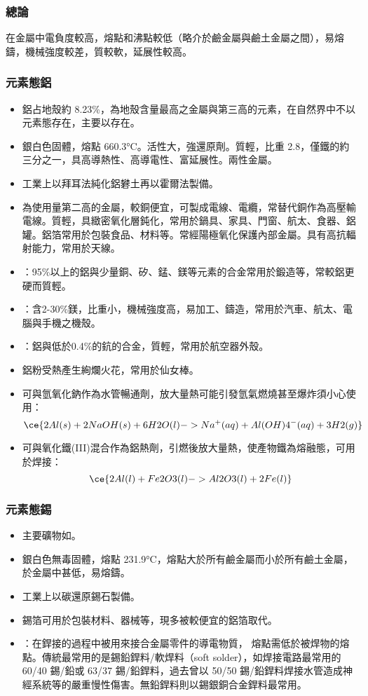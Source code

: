 \documentclass[a4paper,12pt]{report}
\begin{document}
\begin{itemize}
\begin{itemize}
\subsubsection{總論}
在金屬中電負度較高，熔點和沸點較低（略介於鹼金屬與鹼土金屬之間），易熔鑄，機械強度較差，質較軟，延展性較高。
\subsubsection{元素態鋁}
\begin{itemize}
\item 鋁占地殼約 8.23\%，為地殼含量最高之金屬與第三高的元素，在自然界中不以元素態存在，主要以存在。
\item 銀白色固體，熔點 660.3°C。活性大，強還原劑。質輕，比重 2.8，僅鐵的約三分之一，具高導熱性、高導電性、富延展性。兩性金屬。
\item 工業上以拜耳法純化鋁礬土再以霍爾法製備。
\item 為使用量第二高的金屬，較銅便宜，可製成電線、電纜，常替代銅作為高壓輸電線。質輕，具緻密氧化層鈍化，常用於鍋具、家具、門窗、航太、食器、鋁罐。鋁箔常用於包裝食品、材料等。常經陽極氧化保護內部金屬。具有高抗輻射能力，常用於天線。
\item {}：95\%以上的鋁與少量銅、矽、錳、鎂等元素的合金常用於鍛造等，常較鋁更硬而質輕。
\item {}：含2-30\%鎂，比重小，機械強度高，易加工、鑄造，常用於汽車、航太、電腦與手機之機殼。
\item {}：鋁與低於0.4\%的鈧的合金，質輕，常用於航空器外殼。
\item 鋁粉受熱產生絢爛火花，常用於仙女棒。
\item 可與氫氧化鈉作為水管暢通劑，放大量熱可能引發氫氣燃燒甚至爆炸須小心使用：
\[\ce{2Al(s) + 2NaOH(s) + 6H2O(l) -> Na^+(aq) + Al(OH)4^-(aq) + 3H2(g)}\]
\item 可與氧化鐵(III)混合作為鋁熱劑，引燃後放大量熱，使產物鐵為熔融態，可用於焊接：
\[\ce{2Al(l) + Fe2O3(l) -> Al2O3(l) + 2Fe(l)}\]
\end{itemize}
\subsubsection{元素態錫}
\begin{itemize}
\item 主要礦物如。
\item 銀白色無毒固體，熔點 231.9°C，熔點大於所有鹼金屬而小於所有鹼土金屬，於金屬中甚低，易熔鑄。
\item 工業上以碳還原錫石製備。
\item 錫箔可用於包裝材料、器械等，現多被較便宜的鋁箔取代。
\item {}：在銲接的過程中被用來接合金屬零件的導電物質， 熔點需低於被焊物的熔點。傳統最常用的是錫鉛銲料/軟焊料（soft solder），如焊接電路最常用的 60/40 錫/鉛或 63/37 錫/鉛銲料，過去曾以 50/50 錫/鉛銲料焊接水管造成神經系統等的嚴重慢性傷害。無鉛銲料則以錫銀銅合金銲料最常用。
\end{itemize}

\end{itemize}
\end{itemize}
\end{document}
